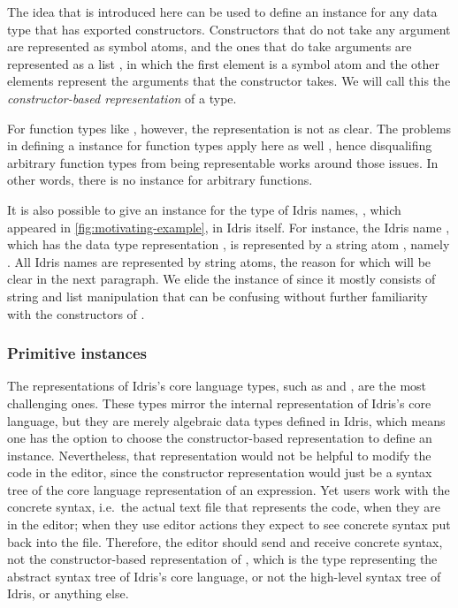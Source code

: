 The idea that is introduced here can be used to define an \Editorable{}
instance for any data type that has exported constructors. Constructors that do
not take any argument are represented as symbol atoms, and the ones that do
take arguments are represented as a list \sexp{}, in which the first element is
a symbol atom and the other elements represent the arguments that the
constructor takes. We will call this the \emph{constructor-based \sexp{}
representation} of a type.

For function types like \mbox{}, however, the \sexp{}
representation is not as clear. The problems in
defining a  instance for function types apply here as well \cite{showfunction},
hence disqualifing arbitrary function types from being \sexp{} representable
works around those issues. In other words, there is no  instance
for arbitrary functions.

It is also possible to give an \Editorable{} instance for the type of Idris
names, , which appeared in \autoref{fig:motivating-example}, in
Idris itself.  For instance, the Idris name , which has the
data type representation , is
represented by a string atom \sexp{}, namely . All Idris
names are represented by string atoms, the reason for which will be clear in
the next paragraph. We elide the \Editorable{} instance of  since
it mostly consists of string and list manipulation that can be confusing
without further familiarity with the constructors of .

\subsubsection{Primitive \Editorable{} instances}

The \sexp{} representations of Idris's core language types, such as \TT{} and
\TyDecl{}, are the most challenging ones. These types mirror the internal
representation of Idris's core language, but they are merely algebraic data
types defined in Idris, which means one has the option to choose the
constructor-based representation to define an \Editorable{} instance.
Nevertheless, that representation would not be helpful to modify the code in
the editor, since the constructor representation would just be a syntax tree of
the core language representation of an expression. Yet users work with the
concrete syntax, i.e.\ the actual text file that represents the code, when they
are in the editor; when they use editor actions they expect to see concrete
syntax put back into the file. Therefore, the editor should send and receive
concrete syntax, not the constructor-based representation of \TT{}, which is the type
representing the abstract syntax tree of Idris's core language, or not the
high-level syntax tree of Idris, or anything else.

